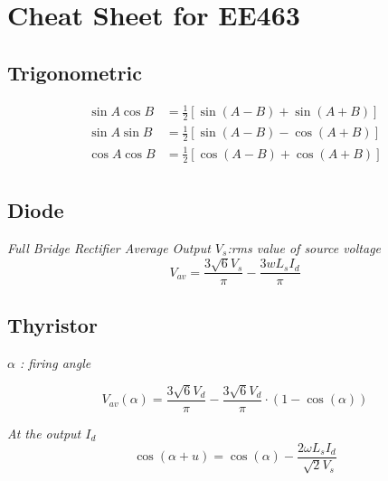 \documentclass[twocolumn, ]{article}
\begin{document}
\section{\small Cheat Sheet for EE463}

\subsection{ \small Trigonometric }

\begin{align*}
          \sin A \cos B &= \frac{1}{2}\left[ \sin(A-B)+\sin(A+B) \right] \\
          \sin A \sin B &= \frac{1}{2}\left[ \sin(A-B)-\cos(A+B) \right] \\
          \cos A \cos B &= \frac{1}{2}\left[ \cos(A-B)+\cos(A+B) \right] \\         
\end{align*}

\subsection{\small Diode}

\textit{Full Bridge Rectifier Average Output $V_{s}$:rms value of source voltage}
\begin{equation*}
 	V_{av}=\frac{3 \sqrt{6} V_{s}}{\pi }-\frac{3wL_{s}I_{d}}{\pi }
\end{equation*}

\subsection{\small Thyristor}
\textit{$\alpha$ : firing angle}

\begin{equation*}
	V_{av}(\alpha)=\frac{3 \sqrt{6} V_{d}}{\pi }-\frac{ 3 \sqrt{6} V_{d}}{\pi }\cdot (1-\cos(\alpha))
\end{equation*}

\textit{At the output $I_{d}$}
\begin{equation*}
	\cos(\alpha + u)=\cos(\alpha)-\dfrac{2\omega L_{s} I_{d}}{\sqrt[]{2}V_{s}}
\end{equation*}
\end{document}
